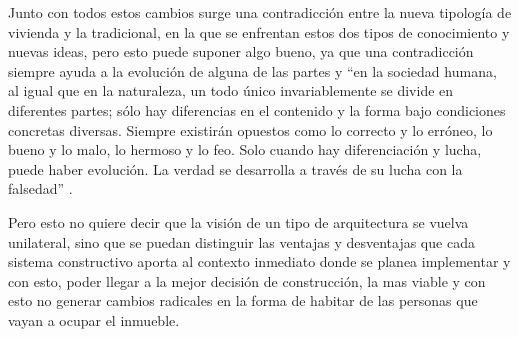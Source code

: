 Junto con todos estos cambios surge una contradicción entre la nueva tipología de vivienda y la tradicional, en la que se enfrentan estos dos tipos de conocimiento y nuevas ideas, pero esto puede suponer algo bueno, ya que una contradicción siempre ayuda a la evolución de alguna de las partes y ``en la sociedad humana, al igual que en la naturaleza, un todo único invariablemente se divide en diferentes partes; sólo hay diferencias en el contenido y la forma bajo condiciones concretas diversas. Siempre existirán opuestos como lo correcto y lo erróneo, lo bueno y lo malo, lo hermoso y lo feo. Solo cuando hay diferenciación y lucha, puede haber evolución. La verdad se desarrolla a través de su lucha con la falsedad'' \citep{mao1974cinco}.

Pero esto no quiere decir que la visión de un tipo de arquitectura se vuelva unilateral, sino que se puedan distinguir las ventajas y desventajas que  cada sistema constructivo aporta al contexto inmediato donde se planea implementar y con esto, poder llegar a la mejor decisión de construcción, la mas viable y con esto no generar cambios radicales en la forma de habitar de las personas que vayan a ocupar el inmueble.
